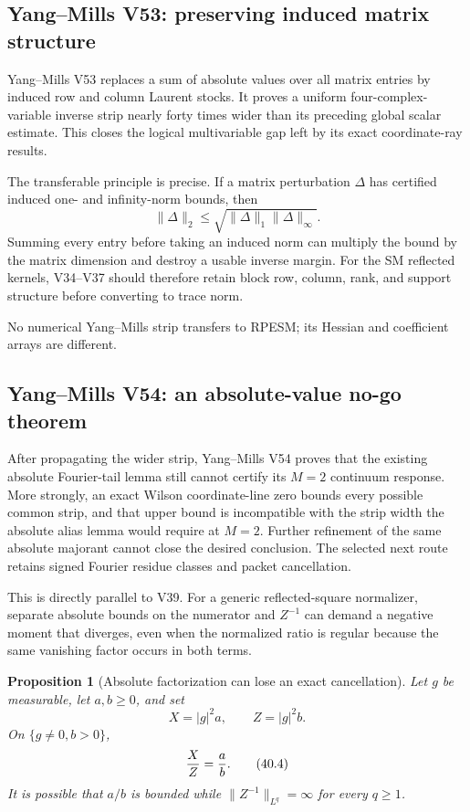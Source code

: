 \documentclass[11pt]{article}
\newtheorem{proposition}[theorem]{Proposition}
\theoremstyle{remark}
\begin{document}
\subsection{Yang--Mills V53: preserving induced matrix structure}

Yang--Mills V53 replaces a sum of absolute values over all matrix
entries by induced row and column Laurent stocks.  It proves a
uniform four-complex-variable inverse strip nearly forty times wider
than its preceding global scalar estimate.  This closes the logical
multivariable gap left by its exact coordinate-ray results.

The transferable principle is precise.  If a matrix perturbation
\(\Delta\) has certified induced one- and infinity-norm bounds, then
\begin{equation}
 \|\Delta\|_2
 \leq
 \sqrt{\|\Delta\|_1\|\Delta\|_\infty}.            \tag{40.3}
\end{equation}
Summing every entry before taking an induced norm can multiply the
bound by the matrix dimension and destroy a usable inverse margin.
For the SM reflected kernels, V34--V37 should therefore retain block
row, column, rank, and support structure before converting to trace
norm.

No numerical Yang--Mills strip transfers to RPESM; its Hessian and
coefficient arrays are different.

\subsection{Yang--Mills V54: an absolute-value no-go theorem}

After propagating the wider strip, Yang--Mills V54 proves that the
existing absolute Fourier-tail lemma still cannot certify its
\(M=2\) continuum response.  More strongly, an exact Wilson
coordinate-line zero bounds every possible common strip, and that
upper bound is incompatible with the strip width the absolute alias
lemma would require at \(M=2\).  Further refinement of the same
absolute majorant cannot close the desired conclusion.  The selected
next route retains signed Fourier residue classes and packet
cancellation.

This is directly parallel to V39.  For a generic reflected-square
normalizer, separate absolute bounds on the numerator and
\(Z^{-1}\) can demand a negative moment that diverges, even when the
normalized ratio is regular because the same vanishing factor occurs
in both terms.

\begin{proposition}[Absolute factorization can lose an exact
cancellation]
\label{prop:v12v40-absolute-loss}
Let \(g\) be measurable, let \(a,b\geq0\), and set
\[
 X=|g|^2a,\qquad Z=|g|^2b.
\]
On \(\{g\ne0,b>0\}\),
\begin{equation}
                         {X\over Z}={a\over b}.   \tag{40.4}
\end{equation}
It is possible that \(a/b\) is bounded while
\(\|Z^{-1}\|_{L^q}=\infty\) for every \(q\geq1\).
\end{proposition}
\end{document}
